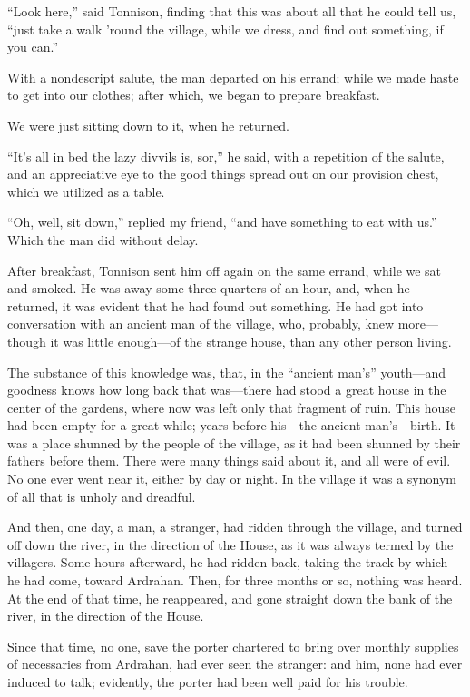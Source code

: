 “Look here,” said Tonnison, finding that this was about all that he could tell us, “just take a walk ’round the village, while we dress, and find out something, if you can.”

With a nondescript salute, the man departed on his errand; while we made haste to get into our clothes; after which, we began to prepare breakfast.

We were just sitting down to it, when he returned.

“It’s all in bed the lazy divvils is, sor,” he said, with a repetition of the salute, and an appreciative eye to the good things spread out on our provision chest, which we utilized as a table.

“Oh, well, sit down,” replied my friend, “and have something to eat with us.” Which the man did without delay.

After breakfast, Tonnison sent him off again on the same errand, while we sat and smoked. He was away some three-quarters of an hour, and, when he returned, it was evident that he had found out something. He had got into conversation with an ancient man of the village, who, probably, knew more---though it was little enough---of the strange house, than any other person living.

The substance of this knowledge was, that, in the “ancient man’s” youth---and goodness knows how long back that was---there had stood a great house in the center of the gardens, where now was left only that fragment of ruin. This house had been empty for a great while; years before his---the ancient man’s---birth. It was a place shunned by the people of the village, as it had been shunned by their fathers before them. There were many things said about it, and all were of evil. No one ever went near it, either by day or night. In the village it was a synonym of all that is unholy and dreadful.

And then, one day, a man, a stranger, had ridden through the village, and turned off down the river, in the direction of the House, as it was always termed by the villagers. Some hours afterward, he had ridden back, taking the track by which he had come, toward Ardrahan. Then, for three months or so, nothing was heard. At the end of that time, he reappeared, and gone straight down the bank of the river, in the direction of the House.

Since that time, no one, save the porter chartered to bring over monthly supplies of necessaries from Ardrahan, had ever seen the stranger: and him, none had ever induced to talk; evidently, the porter had been well paid for his trouble.


